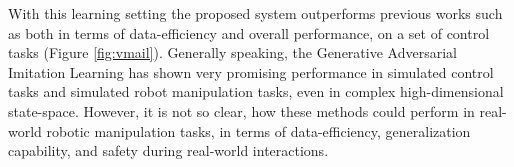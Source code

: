 %

\noindent With this learning setting the proposed system outperforms previous works such as \cite{reddy2019sqil,kostrikov2018discriminator} both in terms of data-efficiency and overall performance, on a set of control tasks (Figure \ref{fig:vmail}).
Generally speaking, the Generative Adversarial Imitation Learning has shown very promising performance in simulated control tasks and simulated robot manipulation tasks, even in complex high-dimensional state-space. However, it is not so clear, how these methods could perform in real-world robotic manipulation tasks, in terms of data-efficiency, generalization capability, and safety during real-world interactions.

